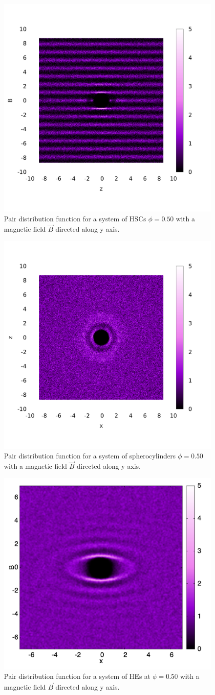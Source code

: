 \documentclass[aip,graphicx]{revtex4-1} %
\begin{document}
\begin{figure}
    \begin{center}
    \includegraphics[width=0.5\columnwidth]{gyz_B.png}
    \caption{Pair distribution function for a system of HSCs $\phi = 0.50$ with a magnetic field $\vec{B}$ directed along y axis.}\label{fig:gyz_B}
    \end{center}
\end{figure}


\begin{figure}
    \centering
    \includegraphics[width=0.5\columnwidth]{gxz_B.png}
    \caption{Pair distribution function for a system of spherocylinders $\phi = 0.50$ with a magnetic field $\vec{B}$ directed along y axis.}\label{fig:gxz_B}
\end{figure}

\begin{figure}
    \begin{center}
    \includegraphics[width=0.4\columnwidth]{gyz_B_HE.png}
    \caption{Pair distribution function for a system of HEs at $\phi = 0.50$ with a magnetic field $\vec{B}$ directed along y axis.}\label{fig:gyz_B_HE}
    \end{center}
\end{figure}
\end{document}

